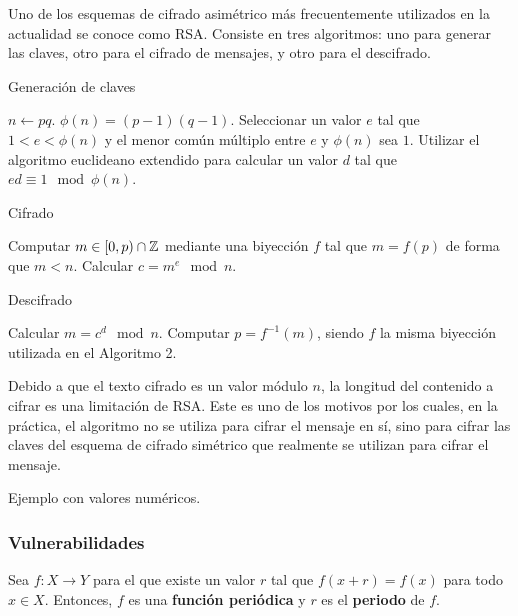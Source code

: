 Uno de los esquemas de cifrado asimétrico más frecuentemente utilizados en la actualidad se conoce como RSA. Consiste en tres algoritmos: uno para generar las claves, otro para el cifrado de mensajes, y otro para el descifrado.

\begin{algorithm}
	\caption{Generación de claves}\label{alg:1}
	$n \gets pq$.
	$\phi(n) = (p - 1)(q - 1)$.
	Seleccionar un valor $e$ tal que $1 < e < \phi(n)$ y el menor común múltiplo entre $e$ y $\phi(n)$ sea $1$.
	Utilizar el algoritmo euclideano extendido para calcular un valor $d$ tal que $ed \equiv 1 \mod \phi(n)$.
\end{algorithm}

\begin{algorithm}
	\caption{Cifrado}\label{alg:2}
	Computar $m \in [0, p) \cap \mathbb{Z}$ mediante una biyección $f$ tal que $m = f(p)$ de forma que $m < n$.
	Calcular $c = m^e \mod n$.
\end{algorithm}

\begin{algorithm}
	\caption{Descifrado}\label{alg:3}
	Calcular $m = c^d \mod n$.
	Computar $p = f^{-1}(m)$, siendo $f$ la misma biyección utilizada en el Algoritmo 2.
\end{algorithm}

\newpage

Debido a que el texto cifrado es un valor módulo $n$, la longitud del contenido a cifrar es una limitación de RSA. Este es uno de los motivos por los cuales, en la práctica, el algoritmo no se utiliza para cifrar el mensaje en sí, sino para cifrar las claves del esquema de cifrado simétrico que realmente se utilizan para cifrar el mensaje.

\begin{example}
	Ejemplo con valores numéricos.
\end{example}

\subsubsection{Vulnerabilidades}

\begin{definition}
	Sea $f : X \rightarrow Y$ para el que existe un valor $r$ tal que $f(x + r) = f(x)$ para todo $x \in X$. Entonces, $f$ es una \textbf{función periódica} y $r$ es el \textbf{periodo} de $f$.
\end{definition}

